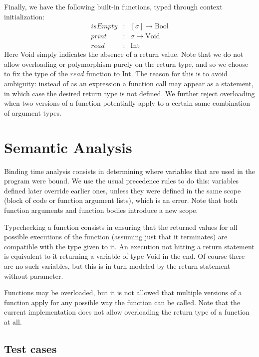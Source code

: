 \documentclass[a4paper]{article}
\begin{document}
Finally, we have the following built-in functions, typed through context initialization:
\[
    \begin{array}{lcl}
        \mathit{isEmpty} & : & [\sigma] \to \text{Bool} \\
        \mathit{print}   & : & \sigma \to \text{Void} \\
        \mathit{read}    & : & \text{Int}
    \end{array}
\]
Here Void simply indicates the absence of a return value.
Note that we do not allow overloading or polymorphism purely on the return type, and so we choose to fix the type of the $\mathit{read}$ function to Int.
The reason for this is to avoid ambiguity: instead of as an expression a function call may appear as a statement, in which case the desired return type is not defined.
We further reject overloading when two versions of a function potentially apply to a certain same combination of argument types.

\section{Semantic Analysis}

Binding time analysis consists in determining where variables that are used in the program were bound.
We use the usual precedence rules to do this: variables defined later override earlier ones, unless they were defined in the same scope (block of code or function argument lists), which is an error.
Note that both function arguments and function bodies introduce a new scope.

Typechecking a function consists in ensuring that the returned values for all possible executions of the function (assuming just that it terminates) are compatible with the type given to it.
An execution not hitting a return statement is equivalent to it returning a variable of type Void in the end.
Of course there are no such variables, but this is in turn modeled by the return statement without parameter.

Functions may be overloaded, but it is not allowed that multiple versions of a function apply for any possible way the function can be called.
Note that the current implementation does not allow overloading the return type of a function at all.

\subsection{Test cases}
\end{document}
